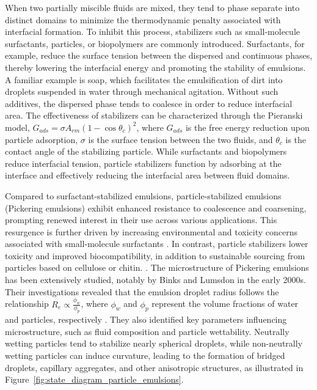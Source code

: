 When two partially miscible fluids are mixed, they tend to phase separate into distinct domains to minimize the thermodynamic penalty associated with interfacial formation. 
To inhibit this process, stabilizers such as small-molecule surfactants, particles, or biopolymers are commonly introduced. Surfactants, for example, reduce the surface tension 
between the dispersed and continuous phases, thereby lowering the interfacial energy and promoting the stability of emulsions. A familiar example is soap, which facilitates the 
emulsification of dirt into droplets suspended in water through mechanical agitation.
Without such additives, the dispersed phase tends to coalesce in order to reduce interfacial area. The effectiveness of stabilizers can be characterized through the Pieranski 
model, $G_{ads} = \sigma A_{rm} (1 - \cos{\theta_c})^2$, where $G_{ads}$ is the free energy reduction upon particle adsorption, $\sigma$ is the surface tension between the two 
fluids, and $\theta_c$ is the contact angle of the stabilizing particle. While surfactants and biopolymers reduce interfacial tension, particle stabilizers function by adsorbing 
at the interface and effectively reducing the interfacial area between fluid domains.

Compared to surfactant-stabilized emulsions, particle-stabilized emulsions (Pickering emulsions) exhibit enhanced resistance to coalescence and coarsening, prompting renewed interest 
in their use across various applications. This resurgence is further driven by increasing environmental and toxicity concerns associated with small-molecule surfactants 
\cite{kaczerewska_environmental_2020, lechuga_acute_2016}. In contrast, particle stabilizers lower toxicity and improved biocompatibility, in addition to 
sustainable sourcing from particles based on cellulose or chitin. \cite{fujisawa_nanocellulose-stabilized_2017, tang_stimuli-responsive_2016, kalliola_carboxymethyl_2018}.
The microstructure of Pickering emulsions has been extensively studied, notably by Binks and Lumsdon in the early 2000s. Their investigations revealed that the emulsion droplet radius 
follows the relationship $R_e \propto \frac{\phi_w}{\phi_p}$, where $\phi_w$ and $\phi_p$ represent the volume fractions of water and particles, respectively \cite{binks_pickering_2001}. 
They also identified key parameters influencing microstructure, such as fluid composition and particle wettability. Neutrally wetting particles tend to stabilize nearly spherical droplets, 
while non-neutrally wetting particles can induce curvature, leading to the formation of bridged droplets, capillary aggregates, and other anisotropic structures, as illustrated in 
Figure~\ref{fig:state_diagram_particle_emulsions}.

